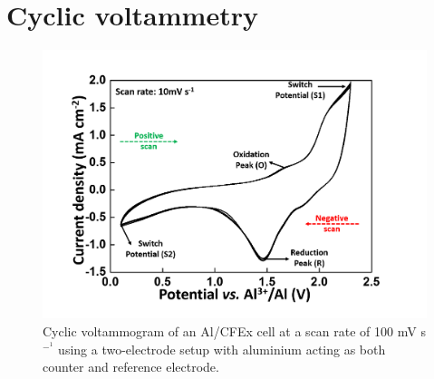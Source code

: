 \section{Cyclic voltammetry}
\begin{figure}[tbh!]
\centering
\includegraphics[width=\textwidth]{Figures/CV}
\caption{Cyclic voltammogram of an Al/CFEx cell at a scan rate of 100 mV s$^-^1$ using a two-electrode setup with aluminium acting as both counter and reference electrode. }
\label{Figures:CV}
\end{figure}
